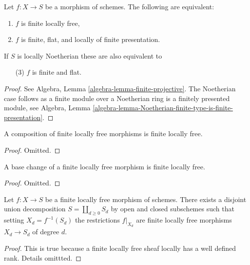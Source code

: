 \begin{lemma}
\label{lemma-finite-flat}
Let $f : X \to S$ be a morphism of schemes.
The following are equivalent:
\begin{enumerate}
\item $f$ is finite locally free,
\item $f$ is finite, flat, and locally of finite presentation.
\end{enumerate}
If $S$ is locally Noetherian these are also equivalent to
\begin{enumerate}
\item[(3)] $f$ is finite and flat.
\end{enumerate}
\end{lemma}

\begin{proof}
See Algebra, Lemma \ref{algebra-lemma-finite-projective}.
The Noetherian case follows as a finite module
over a Noetherian ring is a finitely presented module, see
Algebra,
Lemma \ref{algebra-lemma-Noetherian-finite-type-is-finite-presentation}.
\end{proof}

\begin{lemma}
\label{lemma-composition-finite-locally-free}
A composition of finite locally free morphisms is finite locally free.
\end{lemma}

\begin{proof}
Omitted.
\end{proof}

\begin{lemma}
\label{lemma-base-change-finite-locally-free}
A base change of a finite locally free morphism is finite locally free.
\end{lemma}

\begin{proof}
Omitted.
\end{proof}

\begin{lemma}
\label{lemma-finite-locally-free}
Let $f : X \to S$ be a finite locally free morphism of schemes.
There exists a disjoint union decomposition
$S = \coprod_{d \geq 0} S_d$ by open and closed subschemes
such that setting $X_d = f^{-1}(S_d)$ the restrictions
$f|_{X_d}$ are finite locally free morphisms $X_d \to S_d$
of degree $d$.
\end{lemma}

\begin{proof}
This is true because a finite locally free sheaf locally has
a well defined rank. Details omittted.
\end{proof}

